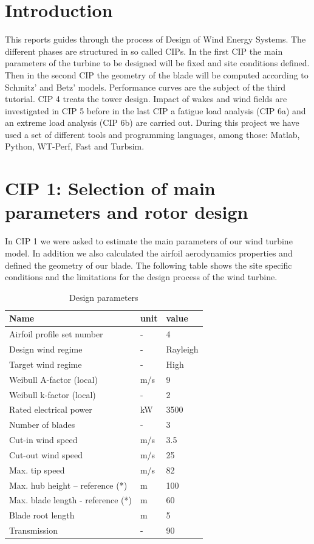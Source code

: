 \documentclass[10pt]{article}
\begin{document}
\section{Introduction}
This reports guides through the process of Design of Wind Energy Systems. The different phases are structured in so called CIPs. In the first CIP the main parameters of the turbine to be designed will be fixed and site conditions defined. Then in the second CIP the geometry of the blade will be computed according to Schmitz' and Betz' models. Performance curves are the subject of the third tutorial. CIP 4 treats the tower design. Impact of wakes and wind fields are investigated in CIP 5 before in the last CIP a fatigue load analysis (CIP 6a) and an extreme load analysis (CIP 6b) are carried out.
During this project we have used a set of different tools and programming languages, among those: Matlab, Python, WT-Perf, Fast and Turbsim.

\section{CIP 1: Selection of main parameters and rotor design}
In CIP 1 we were asked to estimate the main parameters of our wind turbine model. In addition we also calculated the airfoil aerodynamics properties and defined the geometry of our blade.
The following table shows the site specific conditions and the limitations for the design process of the wind turbine.\\

\begin{table}[H]
\begin{tabular}{l l l}
\hline
Name & unit & value\\
\hline
Airfoil profile set number	&-&	4\\
Design wind regime	&-&	Rayleigh\\
Target wind regime	&-&	High\\
Weibull A-factor (local)&	m/s&	9\\
Weibull k-factor (local)	&-&	2\\
Rated electrical power	&kW&	3500\\
Number of blades	&-&	3\\
Cut-in wind speed	&m/s&	3.5\\
Cut-out wind speed	&m/s&	25\\
Max. tip speed	&m/s&	82\\
Max. hub height – reference (*)&	m&	100\\
Max. blade length  - reference (*)	&m&	60\\
Blade root length	&m&	5\\
Transmission	&-&	90\\
\hline

\end{tabular}
\label{designparameters}
\caption{Design parameters}
\end{table}
\end{document}
